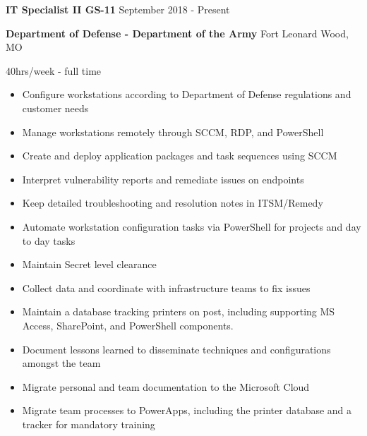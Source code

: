 \documentclass[../main.tex]{subfiles}
\begin{document}
    \textbf{IT Specialist II GS-11}
    \hfill
    September 2018 - Present
    
    \textbf{Department of Defense - Department of the Army}
    \hfill
    Fort Leonard Wood, MO
    
    \hfill
    40hrs/week - full time
    \begin{itemize}
        \item Configure workstations according to Department of Defense regulations and customer needs
        \item Manage workstations remotely through SCCM, RDP, and PowerShell
        \item Create and deploy application packages and task sequences using SCCM
        \item Interpret vulnerability reports and remediate issues on endpoints
        \item Keep detailed troubleshooting and resolution notes in ITSM/Remedy
        \item Automate workstation configuration tasks via PowerShell for projects and day to day tasks
        \item Maintain Secret level clearance
        \item Collect data and coordinate with infrastructure teams to fix issues
        \item Maintain a database tracking printers on post, including supporting MS Access, SharePoint, and PowerShell components.
        \item Document lessons learned to disseminate techniques and configurations amongst the team
        \item Migrate personal and team documentation to the Microsoft Cloud
        \item Migrate team processes to PowerApps, including the printer database and a tracker for mandatory training
    \end{itemize}
\end{document}
